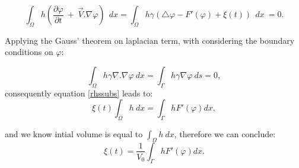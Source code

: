 \documentclass[letterpaper,10pt]{article}
\begin{document}
\begin{equation}
\label{rhssubs}
 \int_\Omega h (\frac{\partial \varphi}{\partial t} \  + \
\overrightarrow{V}.\nabla \varphi) \ \ dx = 
\int_\Omega h \gamma (\bigtriangleup \varphi -F'(\varphi)+\xi(t))  \ \ dx \ = 0 .
\end{equation}

Applying the Gauss' theorem on laplacian term, with considering the boundary conditions on $\varphi$:

\begin{equation}
\label{lapbound}
 \int_\Omega h \gamma  \nabla. \nabla \varphi \ dx = 
 \int_\Gamma h \gamma \nabla \varphi \ ds = 0,
\end{equation}
consequently equation \eqref{rhssubs} leads to:
\begin{equation}
\label{xitcon}
\xi(t)  \int_\Omega h  \ dx = 
 \int_\Gamma h F'(\varphi) dx, 
 \end{equation}


and we know intial volume is equal to $\int_\Omega h  \ dx $, therefore we can conclude:
\begin{equation}
\label{finalxi}
\xi(t)  = \frac{1}{V_0} \int_\Gamma h F'(\varphi) dx. 
 \end{equation}

 


\end{document}
